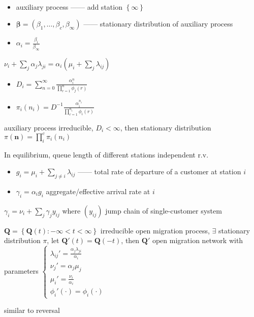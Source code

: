 \begin{example}\,
    \begin{itemize}
        \item auxiliary process ------ add station $\left\{ \infty \right\}$
        \item $\bm \beta = (\beta_1, \dots, \beta_c, \beta_\infty)$ ------ stationary distribution of auxiliary process
        \item $\alpha_i = \frac{\beta_i}{\beta_\infty} $
    \end{itemize}
    \begin{fact}
        $\nu_i + \sum_j \alpha_j \lambda_{ji} = \alpha_i\left(\mu_i + \sum_j \lambda_{ij}\right)$
    \end{fact}
    \begin{itemize}
        \item $D_i = \sum^\infty_{n=0} \frac{\alpha_i^n}{\prod_{r=1}^n \phi_j(r)}$
        \item $\pi_i(n_i) = D^{-1} \frac{\alpha_i^{n_i}}{\prod^{n_i}_{r=1}\phi_i(r)}$
    \end{itemize}
    \begin{thm}
        auxiliary process irreducible, $D_i < \infty$, then stationary distribution $\pi(\bm n) = \prod^c_i \pi_i(n_i)$
    \end{thm}
\end{example}

\begin{fact}
    In equilibrium, queue length of different stations independent r.v.\
\end{fact}

\begin{itemize}
    \item $g_i = \mu_i + \sum_{j \neq i}\lambda_{ij}$ ------ total rate of departure of a customer at station $i$
    \item $\gamma_i = \alpha_i g_i$ \dash aggregate/effective arrival rate at $i$
\end{itemize}

\begin{fact}
    $\gamma_i = \nu_i + \sum_j \gamma_j y_{ij}$ where $(y_{ij})$ jump chain of single-customer system
\end{fact}

\begin{thm}
    $\bm Q = \left\{ \bm Q(t) : -\infty < t < \infty \right\}$ irreducible open migration process, $\exists$ stationary distribution $\pi$,
    let $\bm Q'(t) = \bm Q(-t)$, then $\bm Q'$ open migration network with parameters
    $\begin{cases}
         \lambda_{ij}' = \frac{\alpha_j \lambda_{ji}}{\alpha_i}\\
         \nu_j' = \alpha_j \mu_j\\
         \mu_i' = \frac{\nu_i}{\alpha_{i}}\\
         \phi_i'(\cdot) = \phi_i(\cdot)
    \end{cases}$
\end{thm}
\begin{pf}
    similar to reversal
\end{pf}

